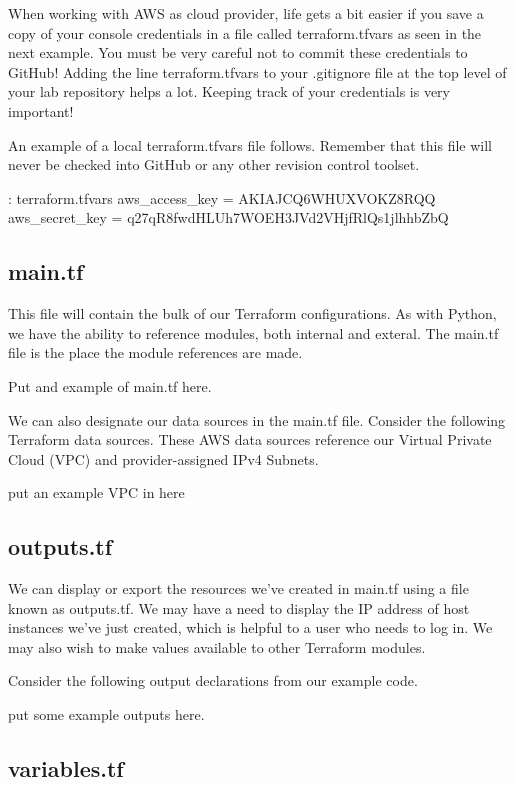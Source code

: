 When working with AWS as cloud provider, life gets a bit easier if you
save a copy of your console credentials in a file called
terraform.tfvars as seen in the next example. You must be very careful
not to commit these credentials to GitHub! Adding the line
terraform.tfvars to your .gitignore file at the top level of your lab
repository helps a lot. Keeping track of your credentials is very
important!

\justify
An example of a local terraform.tfvars file follows. Remember that this
file will never be checked into GitHub or any other revision control
toolset.

\begin{mybox}{\thetcbcounter: terraform.tfvars}
aws\_access\_key = AKIAJCQ6WHUXVOKZ8RQQ
aws\_secret\_key = q27qR8fwdHLUh7WOEH3JVd2VHjfRlQs1jlhhbZbQ
\end{mybox}

\subsection{main.tf}

\justify
This file will contain the bulk of our Terraform configurations. As with
Python, we have the ability to reference modules, both internal and
exteral. The main.tf file is the place the module references are made.

Put and example of main.tf here.

\justify
We can also designate our data sources in the main.tf file. Consider the
following Terraform data sources. These AWS data sources reference our
Virtual Private Cloud (VPC) and provider-assigned IPv4 Subnets.

put an example VPC in here

\subsection{outputs.tf}\label{outputs.tf}

\justify
We can display or export the resources we've created in main.tf using a
file known as outputs.tf. We may have a need to display the IP address
of host instances we've just created, which is helpful to a user who
needs to log in. We may also wish to make values available to other
Terraform modules.

\justify
Consider the following output declarations from our example code.

put some example outputs here.

\subsection{variables.tf}

